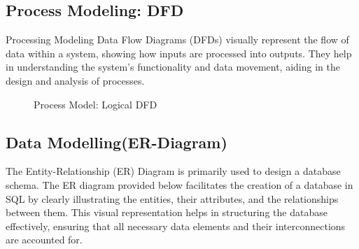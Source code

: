 \subsection{Process Modeling: DFD}
Processing Modeling Data Flow Diagrams (DFDs) visually represent the flow of data within a system, showing how inputs are processed into outputs. They help in understanding the system's functionality and data movement, aiding in the design and analysis of processes.
\begin{figure}[H]
    \centering
    \caption{Process Model: Logical DFD}
\end{figure}
\newpage
\newpage
\subsection{Data Modelling(ER-Diagram)}
The Entity-Relationship (ER) Diagram is primarily used to design a database schema. The ER diagram provided below facilitates the creation of a database in SQL by clearly illustrating the entities, their attributes, and the relationships between them. This visual representation helps in structuring the database effectively, ensuring that all necessary data elements and their interconnections are accounted for.
